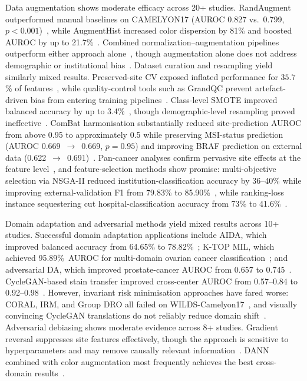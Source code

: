 Data augmentation shows moderate efficacy across 20+ studies. RandAugment
outperformed manual baselines on CAMELYON17 (AUROC 0.827 vs.\ 0.799,
$p < 0.001$)~\citep{faryna2024automatic}, while AugmentHist increased color
dispersion by 81\% and boosted AUROC by up to
21.7\%~\citep{franchet2024bias}. Combined normalization--augmentation
pipelines outperform either approach alone~\citep{franchet2024bias}, though augmentation
alone does not address demographic or institutional
bias~\citep{howard2021site}. Dataset curation and resampling yield similarly mixed results. Preserved-site CV exposed inflated performance for $35.7$\% of
features~\citep{howard2021site}, while quality-control tools such as GrandQC
prevent artefact-driven bias from entering training
pipelines~\citep{weng2024grandqc}. Class-level SMOTE improved balanced
accuracy by up to 3.4\%~\citep{rezama2018imbalanced}, though
demographic-level resampling proved
ineffective~\citep{soltan2024challenges}. ComBat harmonisation substantially reduced site-prediction AUROC from
above 0.95 to approximately 0.5 while preserving MSI-status prediction
(AUROC 0.669~$\to$~0.669, $p = 0.95$) and improving BRAF prediction
on external data (0.622~$\to$~0.691)~\citep{murchan2024combat}.
Pan-cancer analyses confirm pervasive site effects at the feature
level~\citep{chen2022pan}, and feature-selection methods show promise: multi-objective selection via
NSGA-II reduced institution-classification accuracy by 36--40\% while
improving external-validation F1 from 79.83\% to
85.90\%~\citep{bidgoli2022bias}, while ranking-loss instance sequestering
cut hospital-classification accuracy from 73\% to
41.6\%~\citep{mazaheri2023ranking}.

\label{sec:results:mit:ssl}%
Domain adaptation and adversarial methods yield mixed results across 10+ studies. Successful domain adaptation applications include AIDA, which improved balanced accuracy from 64.65\% to
78.82\%~\citep{asadiaghbolagh2024learning}; K-TOP MIL, which achieved 95.89\%~AUROC
for multi-domain ovarian cancer classification~\citep{ahmed2025robust}; and adversarial DA, which improved
prostate-cancer AUROC from 0.657 to
0.745~\citep{ren2019unsupervised}. CycleGAN-based stain transfer
improved cross-center AUROC from 0.57--0.84 to
0.92--0.98~\citep{nerrienet2023standardized}. However, invariant risk minimisation approaches have fared worse: CORAL, IRM, and
Group DRO all failed on WILDS-Camelyon17~\citep{koh2021wilds}, and visually
convincing CycleGAN translations do not reliably reduce domain
shift~\citep{vasiljevic2022cyclegan}. Adversarial debiasing shows moderate evidence across 8+ studies. Gradient reversal suppresses site
features effectively, though the approach is sensitive to hyperparameters and
may remove causally relevant
information~\citep{lafarge2019learning, otalora2019staining}. DANN
combined with color augmentation most frequently achieves the best
cross-domain results~\citep{otalora2019staining}.

